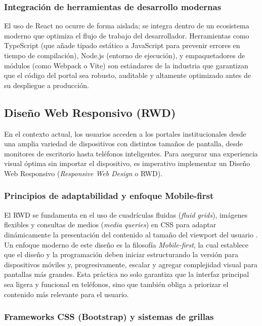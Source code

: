 \subsubsection*{Integración de herramientas de desarrollo modernas}

El uso de React no ocurre de forma aislada; se integra dentro de un ecosistema moderno que optimiza el flujo de trabajo del desarrollador. Herramientas como TypeScript (que añade tipado estático a JavaScript para prevenir errores en tiempo de compilación), Node.js (entorno de ejecución), y empaquetadores de módulos (como Webpack o Vite) son estándares de la industria que garantizan que el código del portal sea robusto, auditable y altamente optimizado antes de su despliegue a producción.

\subsection{Diseño Web Responsivo (RWD)}
\label{sec:rwd}

En el contexto actual, los usuarios acceden a los portales institucionales desde una amplia variedad de dispositivos con distintos tamaños de pantalla, desde monitores de escritorio hasta teléfonos inteligentes. Para asegurar una experiencia visual óptima sin importar el dispositivo, es imperativo implementar un Diseño Web Responsivo (\textit{Responsive Web Design} o RWD).

\subsubsection*{Principios de adaptabilidad y enfoque Mobile-first}

El RWD se fundamenta en el uso de cuadrículas fluidas (\textit{fluid grids}), imágenes flexibles y consultas de medios (\textit{media queries}) en CSS para adaptar dinámicamente la presentación del contenido al tamaño del viewport del usuario \cite{marcotte2014responsive}. Un enfoque moderno de este diseño es la filosofía \textit{Mobile-first}, la cual establece que el diseño y la programación deben iniciar estructurando la versión para dispositivos móviles y, progresivamente, escalar y agregar complejidad visual para pantallas más grandes. Esta práctica no solo garantiza que la interfaz principal sea ligera y funcional en teléfonos, sino que también obliga a priorizar el contenido más relevante para el usuario.

\subsubsection*{Frameworks CSS (Bootstrap) y sistemas de grillas}


